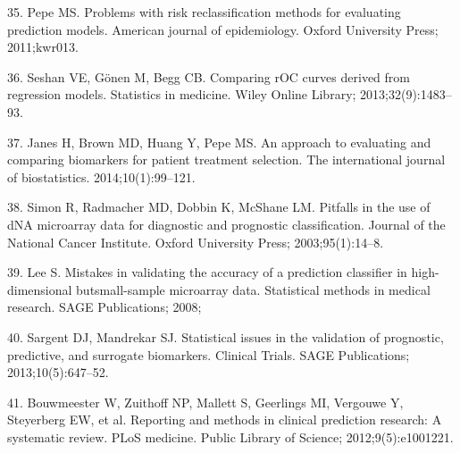 \documentclass[11pt]{article}
\begin{document}
35. Pepe MS. Problems with risk reclassification methods for evaluating
prediction models. American journal of epidemiology. Oxford University
Press; 2011;kwr013.

36. Seshan VE, G{ö}nen M, Begg CB. Comparing rOC curves derived from
regression models. Statistics in medicine. Wiley Online Library;
2013;32(9):1483--93.

37. Janes H, Brown MD, Huang Y, Pepe MS. An approach to evaluating and
comparing biomarkers for patient treatment selection. The international
journal of biostatistics. 2014;10(1):99--121.

38. Simon R, Radmacher MD, Dobbin K, McShane LM. Pitfalls in the use of
dNA microarray data for diagnostic and prognostic classification.
Journal of the National Cancer Institute. Oxford University Press;
2003;95(1):14--8.

39. Lee S. Mistakes in validating the accuracy of a prediction
classifier in high-dimensional butsmall-sample microarray data.
Statistical methods in medical research. SAGE Publications; 2008;

40. Sargent DJ, Mandrekar SJ. Statistical issues in the validation of
prognostic, predictive, and surrogate biomarkers. Clinical Trials. SAGE
Publications; 2013;10(5):647--52.

41. Bouwmeester W, Zuithoff NP, Mallett S, Geerlings MI, Vergouwe Y,
Steyerberg EW, et al. Reporting and methods in clinical prediction
research: A systematic review. PLoS medicine. Public Library of Science;
2012;9(5):e1001221.
\end{document}
